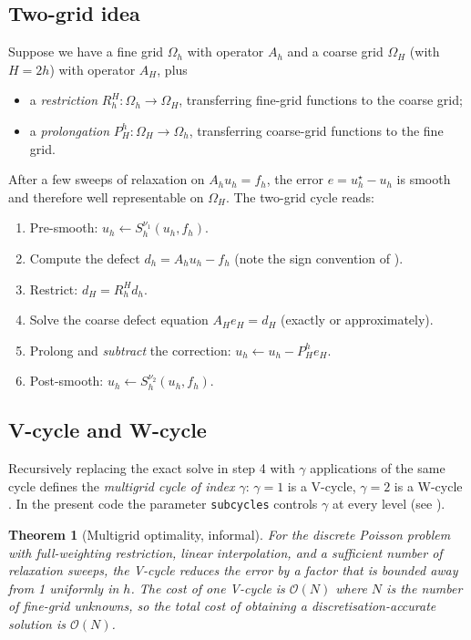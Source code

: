 \documentclass[11pt]{article}
\newtheorem{theorem}{Theorem}
\theoremstyle{definition}
\newcommand{\bigO}{\mathcal{O}}
\begin{document}
\subsection{Two-grid idea}
Suppose we have a fine grid $\Omega_h$ with operator $A_h$ and a coarse
grid $\Omega_H$ (with $H=2h$) with operator $A_H$, plus
\begin{itemize}[nosep]
  \item a \emph{restriction} $R_h^H : \Omega_h \to \Omega_H$, transferring
    fine-grid functions to the coarse grid;
  \item a \emph{prolongation} $P_H^h : \Omega_H \to \Omega_h$, transferring
    coarse-grid functions to the fine grid.
\end{itemize}
After a few sweeps of relaxation on $A_h u_h = f_h$, the error
$e = u_h^\star - u_h$ is smooth and therefore well representable on
$\Omega_H$.  The two-grid cycle reads:
\begin{enumerate}[leftmargin=*,nosep]
  \item Pre-smooth: $u_h \leftarrow S_h^{\nu_1}(u_h, f_h)$.
  \item Compute the defect $d_h = A_h u_h - f_h$ (note the sign convention
    of ).
  \item Restrict: $d_H = R_h^H d_h$.
  \item Solve the coarse defect equation
    $A_H e_H = d_H$ (exactly or approximately).
  \item Prolong and \emph{subtract} the correction:
    $u_h \leftarrow u_h - P_H^h e_H$.
  \item Post-smooth: $u_h \leftarrow S_h^{\nu_2}(u_h, f_h)$.
\end{enumerate}

\subsection{V-cycle and W-cycle}
Recursively replacing the exact solve in step 4 with $\gamma$ applications
of the same cycle defines the \emph{multigrid cycle of index $\gamma$}:
$\gamma=1$ is a V-cycle, $\gamma=2$ is a W-cycle
\cite[Fig.~3.1]{trottenberg2001multigrid}.  In the present code the
parameter \texttt{subcycles} controls $\gamma$ at every level (see
).

\begin{theorem}[Multigrid optimality, informal]\label{thm:mg}
For the discrete Poisson problem with full-weighting restriction,
linear interpolation, and a sufficient number of relaxation sweeps,
the V-cycle reduces the error by a factor that is bounded away from 1
\emph{uniformly in $h$}.  The cost of one V-cycle is $\bigO(N)$ where
$N$ is the number of fine-grid unknowns, so the total cost of obtaining
a discretisation-accurate solution is $\bigO(N)$.
\end{theorem}
\end{document}

